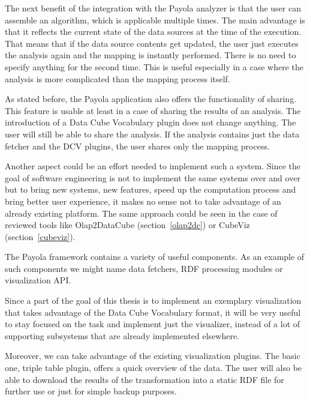 The next benefit of the integration with the Payola analyzer is that the user 
can assemble an algorithm, which is applicable multiple times. The main 
advantage is that it reflects the current state of the data sources at
the time of the execution. That means that if the data source contents get 
updated, the user just executes the analysis again and the mapping is instantly 
performed. There is no need to specify anything for the second time.
This is useful especially in a case where the analysis is more complicated than the 
mapping process itself.

As stated before, the Payola application also offers the functionality of 
sharing. This feature is usable at least in a case of sharing the results 
of an analysis. The introduction of a Data Cube Vocabulary plugin does not change anything.
The user will still be able to share the analysis. If the analysis contains just the data fetcher 
and the DCV plugins, the user shares only the mapping process.

Another aspect could be an effort needed to implement such a system. Since the 
goal of software engineering is not to implement the same systems over and over 
but to bring new systems, new features, speed up the computation process and 
bring better user experience, it makes no sense not to take advantage of 
an already existing platform. The same approach could be seen in the case of reviewed 
tools like Olap2DataCube (section~\ref{olap2dc}) or CubeViz 
(section~\ref{cubeviz}).

The Payola framework contains a variety of useful components. As an example of 
such components we might name data fetchers, RDF processing modules or 
visualization API.

Since a part of the goal of this thesis is to implement an exemplary 
visualization that takes advantage of the Data Cube Vocabulary format, it will 
be very useful to stay focused on the task and implement just the visualizer, 
instead of a lot of supporting subsystems that are already 
implemented elsewhere.

Moreover, we can take advantage of the existing visualization plugins. The basic 
one, triple table plugin, offers a quick overview of the data. The user 
will also be able to download the results of the transformation into a static 
RDF file for further use or just for simple backup purposes.

